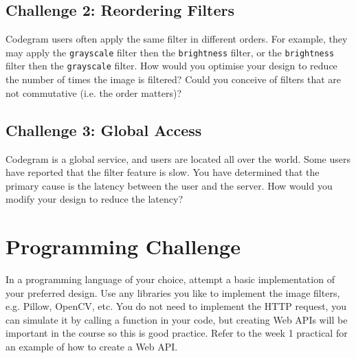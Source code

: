 \documentclass{csse4400}
\begin{document}
\subsection*{Challenge 2: Reordering Filters}
Codegram users often apply the same filter in different orders.
For example, they may apply the \texttt{grayscale} filter then the \texttt{brightness} filter,
or the \texttt{brightness} filter then the \texttt{grayscale} filter.
How would you optimise your design to reduce the number of times the image is filtered?
Could you conceive of filters that are not commutative (i.e. the order matters)?

\subsection*{Challenge 3: Global Access}
Codegram is a global service, and users are located all over the world.
Some users have reported that the filter feature is slow.
You have determined that the primary cause is the latency between the user and the server.
How would you modify your design to reduce the latency?


\section{Programming Challenge}
In a programming language of your choice,
attempt a basic implementation of your preferred design.
Use any libraries you like to implement the image filters, e.g. Pillow, OpenCV, etc.
You do not need to implement the HTTP request, you can simulate it by calling a function in your code,
but creating Web APIs will be important in the course so this is good practice.
Refer to the week 1 practical \cite{prac-week1} for an example of how to create a Web API.





\end{document}
